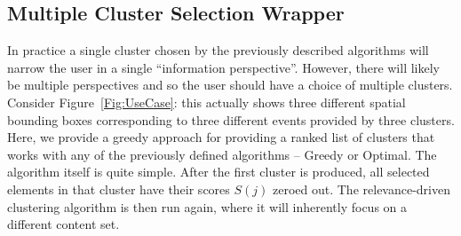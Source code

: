 



\subsection{Multiple Cluster Selection Wrapper}

In practice a single cluster chosen by the previously described algorithms will narrow the user in a single \textquotedblleft information perspective\textquotedblright{}. However, there will likely be multiple perspectives and so the user should have a choice of multiple clusters.  
Consider Figure~\ref{Fig:UseCase}: this actually shows three different spatial bounding boxes corresponding to three different events provided by three clusters.
Here, we provide a greedy approach for providing a ranked list of clusters that works with any of the previously defined algorithms -- Greedy or Optimal.%
The algorithm itself is quite simple.  After the first cluster is produced, all selected elements in that cluster have their scores $S(j)$ zeroed out.  The relevance-driven clustering algorithm is then run again, where it will inherently focus on a different content set.  










